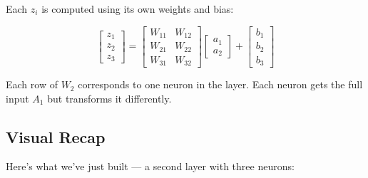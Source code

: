 \documentclass[11pt]{article}
\begin{document}
Each $z_i$ is computed using its own weights and bias:

\[
\begin{bmatrix}
z_1 \\
z_2 \\
z_3
\end{bmatrix}
=
\begin{bmatrix}
W_{11} & W_{12} \\
W_{21} & W_{22} \\
W_{31} & W_{32}
\end{bmatrix}
\begin{bmatrix}
a_1 \\
a_2
\end{bmatrix}
+
\begin{bmatrix}
b_1 \\
b_2 \\
b_3
\end{bmatrix}
\]

\begin{recapbox}[title=Reminder]
Each row of $W_2$ corresponds to one neuron in the layer.  
Each neuron gets the full input $A_1$ but transforms it differently.
\end{recapbox}

\subsection{Visual Recap}

Here’s what we’ve just built — a second layer with three neurons:
\end{document}
